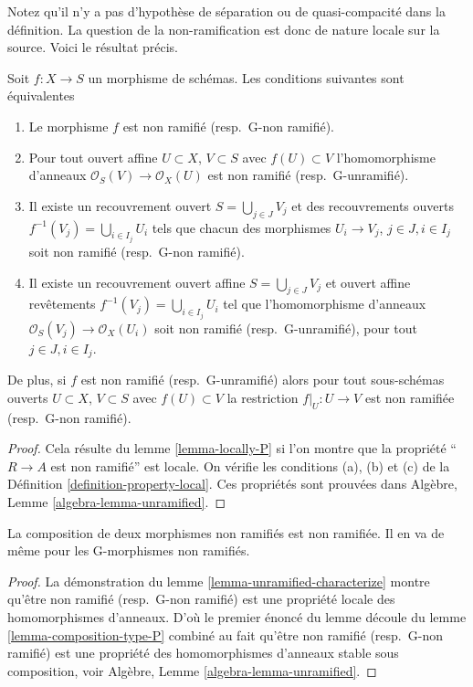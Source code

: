 \noindent
Notez qu'il n'y a pas d'hypothèse de séparation ou de quasi-compacité dans
la définition. La question de la non-ramification est donc de nature locale
sur la source. Voici le résultat précis.

\begin{lemma}
\label{lemma-unramified-characterize}
Soit $f : X \to S$ un morphisme de schémas. Les conditions
suivantes sont équivalentes
\begin{enumerate}
\item Le morphisme $f$ est non ramifié (resp.\ G-non ramifié).
\item Pour tout ouvert affine $U \subset X$, $V \subset S$
avec $f(U) \subset V$ l'homomorphisme
d'anneaux $\mathcal{O}_S(V) \to \mathcal{O}_X(U)$ est non ramifié (resp.\ G-unramifié).
\item Il existe un recouvrement ouvert $S = \bigcup_{j \in J} V_j$ et des
recouvrements ouverts $f^{-1}(V_j) = \bigcup_{i \in I_j} U_i$ tels que chacun des
morphismes $U_i \to V_j$, $j\in J, i\in I_j$ soit non ramifié (resp.\ G-non
ramifié).
\item Il existe un recouvrement ouvert affine $S = \bigcup_{j \in J} V_j$
et ouvert affine revêtements $f^{-1}(V_j) = \bigcup_{i \in I_j} U_i$ tel que l'homomorphisme
d'anneaux $\mathcal{O}_S(V_j) \to \mathcal{O}_X(U_i)$ soit non ramifié (resp.\ G-unramifié),
pour tout $j\in J, i\in I_j$.
\end{enumerate}
De plus, si $f$ est non ramifié (resp.\ G-unramifié)
alors pour tout sous-schémas ouverts $U \subset X$, $V \subset S$ avec $f(U) \subset V$
la restriction $f|_U : U \to V$ est non ramifiée (resp.\ G-non ramifié).
\end{lemma}

\begin{proof}
Cela résulte du lemme \ref{lemma-locally-P} si l'on montre que la propriété
``$R \to A$ est non ramifié''
est locale. On vérifie les conditions (a),
(b) et (c) de la Définition
\ref{definition-property-local}. Ces propriétés sont
prouvées dans Algèbre, Lemme \ref{algebra-lemma-unramified}.
\end{proof}

\begin{lemma}
\label{lemma-composition-unramified}
La composition de deux morphismes non ramifiés est non ramifiée. Il en va
de même pour les G-morphismes non ramifiés.
\end{lemma}

\begin{proof}
La démonstration du lemme \ref{lemma-unramified-characterize} montre qu'être
non ramifié (resp.\ G-non ramifié) est
une propriété locale des homomorphismes
d'anneaux. D'où le premier énoncé du lemme
découle du lemme \ref{lemma-composition-type-P} combiné au fait
qu'être non ramifié (resp.\ G-non ramifié)
est une propriété des homomorphismes d'anneaux stable sous composition,
voir Algèbre, Lemme \ref{algebra-lemma-unramified}.
\end{proof}


